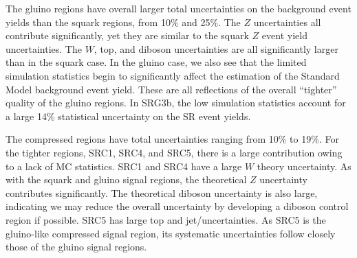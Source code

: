 The gluino regions have overall larger total uncertainties on the background event yields than the squark regions, from 10\% and 25\%.
The $Z$ uncertainties all contribute significantly, yet they are similar to the squark $Z$ event yield uncertainties.
The $W$, top, and diboson uncertainties are all significantly larger than in the squark case.
In the gluino case, we also see that the limited simulation statistics begin to significantly affect the estimation of the Standard Model background event yield.
These are all reflections of the overall ``tighter'' quality of the gluino regions.
In SRG3b, the low simulation statistics account for a large 14\% statistical uncertainty on the SR event yields.

The compressed regions have total uncertainties ranging from 10\% to 19\%.
For the tighter regions, SRC1, SRC4, and SRC5, there is a large contribution owing to a lack of MC statistics.
SRC1 and SRC4 have a large $W$ theory uncertainty.
As with the squark and gluino signal regions, the theoretical $Z$ uncertainty contributes significantly.
The theoretical diboson uncertainty is also large, indicating we may reduce the overall uncertainty by developing a diboson control region if possible.
SRC5 has large top and jet/\met uncertainties.
As SRC5 is the gluino-like compressed signal region, its systematic uncertainties follow closely those of the gluino signal regions.



